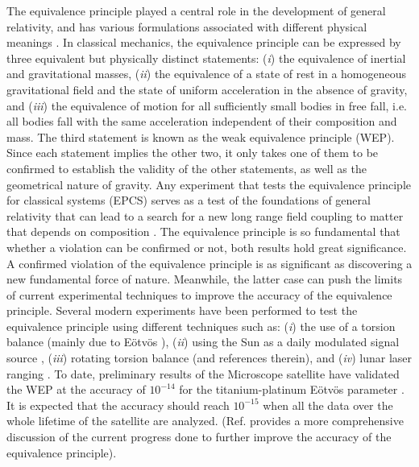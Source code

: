 \documentclass[%
 reprint,
 amsmath,amssymb,
 aps,
]{revtex4-1}
\begin{document}
The equivalence principle played a central role in the development of general relativity, and has various formulations associated with different physical meanings \cite{epstatement}. In classical mechanics, the equivalence principle can be expressed by three equivalent but physically distinct statements: ({\it i}) the equivalence of inertial and gravitational masses, ({\it ii}) the equivalence of a state of rest in a homogeneous gravitational field and the state of uniform acceleration in the absence of gravity, and ({\it iii}) the equivalence of motion for all sufficiently small bodies in free fall, i.e. all bodies fall with the same acceleration independent of their composition and mass. The third statement is known as the weak equivalence principle (WEP). Since each statement implies the other two, it only takes one of them to be confirmed to establish the validity of the other statements, as well as the geometrical nature of gravity. Any experiment that tests the equivalence principle for classical systems (EPCS) serves as a test of the foundations of general relativity that can lead to a search for a new long range field coupling to matter that depends on composition \cite{experimenta}. The equivalence principle is so fundamental that whether a violation can be confirmed or not, both results hold great significance. A confirmed violation of the equivalence principle is as significant as discovering a new fundamental force of nature. Meanwhile, the latter case can push the limits of current experimental techniques to improve the accuracy of the equivalence principle. Several modern experiments have been performed to test the equivalence principle using different techniques such as: ({\it i}) the use of a torsion balance (mainly due to E\"{o}tv\"{o}s \cite{eotvosa,eotvosb}), ({\it ii}) using the Sun as a daily modulated signal source \cite{sun1,sun2,sun3}, ({\it iii}) rotating torsion balance \cite{wagner} (and references therein), and ({\it iv}) lunar laser ranging \cite{lunarlaser1,lunarlaser2,lunarlaser3}. To date, preliminary results of the Microscope satellite have validated the WEP at the accuracy of $10^{-14}$ for the titanium-platinum E\"{o}tv\"{o}s parameter \cite{wepexp}. It is expected that the accuracy should reach $10^{-15}$ when all the data over the whole lifetime of the satellite are analyzed. (Ref. \cite{experimenta} provides a more comprehensive discussion of the current progress done to further improve the accuracy of the equivalence principle).
\end{document}
